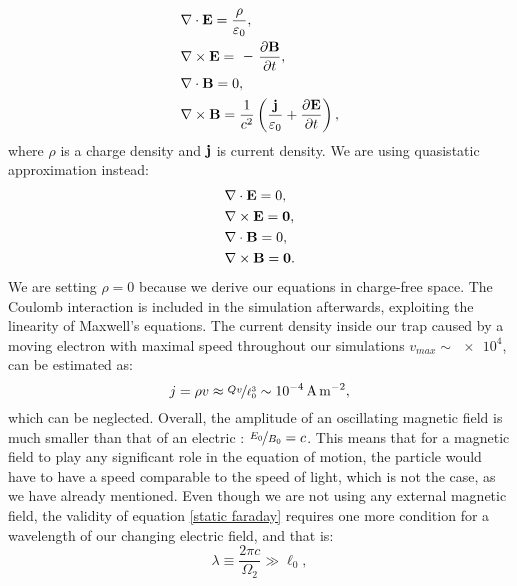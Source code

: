 \begin{description}
\begin{subequations}
\begin{align}
	\label{full gauss}
	&\nabla \cdot \vb{E} = \dfrac{\rho}{\varepsilon_0}, \\
	\label{full faraday}
	&\nabla \times \vb{E} = \minus\dfrac{\partial\vb{B}}{\partial t}, \\
	\label{full magnet}
	&\nabla \cdot \vb{B} = 0, \\
	\label{full ampere}
	&\nabla \times \vb{B} = \dfrac{1}{c^2} \left( \dfrac{\vb{j}}{\varepsilon_0} +  \dfrac{\partial\vb{E}}{\partial t} \right),
\end{align}
\end{subequations}
where $\rho$ is a charge density and $\vb{j}$ is current density. We are using quasistatic approximation instead:
\begin{subequations}
\label{static maxwell}
\begin{align}
	\label{static gauss}
	&\nabla \cdot \vb{E} = 0, \\
	\label{static faraday}
	&\nabla \times \vb{E} = \vb{0}, \\
	\label{static magnet}
	&\nabla \cdot \vb{B} = 0, \\
	\label{static ampere}
	&\nabla \times \vb{B} = \vb{0}.
\end{align}
\end{subequations}
We are setting $\rho=0$ because we derive our equations in charge-free space. The Coulomb interaction is included in the simulation afterwards, exploiting the linearity of Maxwell's equations. The current density inside our trap caused by a moving electron with maximal speed throughout our simulations $v_{max} \sim \num{e+4}$, can be estimated as:
\begin{equation}
	j = \rho v \approx \nicefrac{Q v}{\ell_0^3} \sim \SI{e-4}{A.m^{-2}},
\end{equation}
which can be neglected. Overall, the amplitude of an oscillating magnetic field is much smaller than that of an electric \cite{Friedman_1982}: $\nicefrac{E_0}{B_0} = c$. This means that for a magnetic field to play any significant role in the equation of motion, the particle would have to have a speed comparable to the speed of light, which is not the case, as we have already mentioned. Even though we are not using any external magnetic field, the validity of equation \eqref{static faraday} requires one more condition \cite{Friedman_1982} for a wavelength of our changing electric field, and that is:
\begin{equation}
	\lambda \equiv \dfrac{2\pi c}{\Omega_2} \gg \ell_0,
\end{equation}

\end{description}

